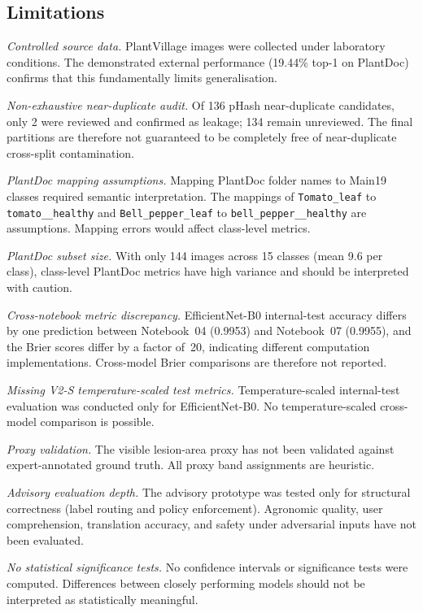 \documentclass[conference]{IEEEtran}
\begin{document}
\subsection{Limitations}

\textit{Controlled source data.}
PlantVillage images were collected under laboratory conditions. The
demonstrated external performance (19.44\% top-1 on PlantDoc)
confirms that this fundamentally limits generalisation.

\textit{Non-exhaustive near-duplicate audit.}
Of 136 pHash near-duplicate candidates, only 2 were reviewed and
confirmed as leakage; 134 remain unreviewed. The final partitions
are therefore not guaranteed to be completely free of near-duplicate
cross-split contamination.

\textit{PlantDoc mapping assumptions.}
Mapping PlantDoc folder names to Main19 classes required semantic
interpretation. The mappings of \texttt{Tomato\_leaf} to
\texttt{tomato\_\_healthy} and \texttt{Bell\_pepper\_leaf} to
\texttt{bell\_pepper\_\_healthy} are assumptions. Mapping errors
would affect class-level metrics.

\textit{PlantDoc subset size.}
With only 144 images across 15 classes (mean 9.6 per class),
class-level PlantDoc metrics have high variance and should be
interpreted with caution.

\textit{Cross-notebook metric discrepancy.}
EfficientNet-B0 internal-test accuracy differs by one prediction
between Notebook~04 (0.9953) and Notebook~07 (0.9955), and the
Brier scores differ by a factor of~20, indicating different
computation implementations. Cross-model Brier comparisons are
therefore not reported.

\textit{Missing V2-S temperature-scaled test metrics.}
Temperature-scaled internal-test evaluation was conducted only for
EfficientNet-B0. No temperature-scaled cross-model comparison is
possible.

\textit{Proxy validation.}
The visible lesion-area proxy has not been validated against
expert-annotated ground truth. All proxy band assignments are
heuristic.

\textit{Advisory evaluation depth.}
The advisory prototype was tested only for structural correctness
(label routing and policy enforcement). Agronomic quality, user
comprehension, translation accuracy, and safety under adversarial
inputs have not been evaluated.

\textit{No statistical significance tests.}
No confidence intervals or significance tests were computed.
Differences between closely performing models should not be
interpreted as statistically meaningful.
\end{document}
